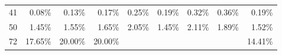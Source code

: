 \begin{table}[]
\begin{center}
\begin{tabular}{crrrrrrrr}
41    & 0.08\%                   & 0.13\%                   & 0.17\%                   & 0.25\%                   & 0.19\%                   & 0.32\%                   & 0.36\%                   & 0.19\%                      \\
50    & 1.45\%                   & 1.55\%                   & 1.65\%                   & 2.05\%                   & 1.45\%                   & 2.11\%                   & 1.89\%                   & 1.52\%                      \\
72    & 17.65\%                  & 20.00\%                  & 20.00\%                  &                          &                          &                          &                          & 14.41\%                    
\\ \hline
\end{tabular}
\end{center}
\end{table}
